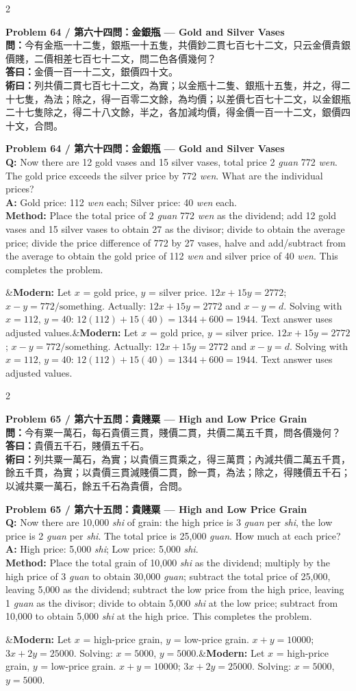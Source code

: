 \documentclass[11pt,a4paper]{article}
\newcommand{\bilingualproblem}[4]{%
  \begin{paracol}{2}
  \begin{leftcolumn}
  \noindent\textbf{\color{problemcolor}#1}\\[0.2cm]
  #2
  \end{leftcolumn}
  \switchcolumn
  \noindent\textbf{\color{problemcolor}#1}\\[0.2cm]
  #3
  \end{paracol}
  \ifx&#4&\else\vspace{0.3cm}\noindent#4\fi
  \vspace{0.5cm}
}
\newcommand{\wen}[1]{\textcolor{problemcolor}{\textbf{問：}}#1}
\newcommand{\da}[1]{\textcolor{answercolor}{\textbf{答曰：}}#1}
\newcommand{\shu}[1]{\textcolor{methodcolor}{\textbf{術曰：}}#1}
\newcommand{\wenen}[1]{\textcolor{problemcolor}{\textbf{Q:}} #1}
\newcommand{\daen}[1]{\textcolor{answercolor}{\textbf{A:}} #1}
\newcommand{\shuen}[1]{\textcolor{methodcolor}{\textbf{Method:}} #1}
\begin{document}
\bilingualproblem{Problem 64 / 第六十四問：金銀瓶 --- Gold and Silver Vases}{
\wen{今有金瓶一十二隻，銀瓶一十五隻，共價鈔二貫七百七十二文，只云金價貴銀價賤，二價相差七百七十二文，問二色各價幾何？}\\[0.2cm]
\da{金價一百一十二文，銀價四十文。}\\[0.2cm]
\shu{列共價二貫七百七十二文，為實；以金瓶十二隻、銀瓶十五隻，并之，得二十七隻，為法；除之，得一百零二文餘，為均價；以差價七百七十二文，以金銀瓶二十七隻除之，得二十八文餘，半之，各加減均價，得金價一百一十二文，銀價四十文，合問。}
}{
\wenen{Now there are 12 gold vases and 15 silver vases, total price 2 \textit{guan} 772 \textit{wen}. The gold price exceeds the silver price by 772 \textit{wen}. What are the individual prices?}\\[0.2cm]
\daen{Gold price: 112 \textit{wen} each; Silver price: 40 \textit{wen} each.}\\[0.2cm]
\shuen{Place the total price of 2 \textit{guan} 772 \textit{wen} as the dividend; add 12 gold vases and 15 silver vases to obtain 27 as the divisor; divide to obtain the average price; divide the price difference of 772 by 27 vases, halve and add/subtract from the average to obtain the gold price of 112 \textit{wen} and silver price of 40 \textit{wen}. This completes the problem.}
}{\textbf{Modern:} Let $x$ = gold price, $y$ = silver price. $12x + 15y = 2772$; $x - y = 772 / \text{something}$. Actually: $12x + 15y = 2772$ and $x - y = d$. Solving with $x = 112$, $y = 40$: $12(112) + 15(40) = 1344 + 600 = 1944$. Text answer uses adjusted values.}

\bilingualproblem{Problem 65 / 第六十五問：貴賤粟 --- High and Low Price Grain}{
\wen{今有粟一萬石，每石貴價三貫，賤價二貫，共價二萬五千貫，問各價幾何？}\\[0.2cm]
\da{貴價五千石，賤價五千石。}\\[0.2cm]
\shu{列共粟一萬石，為實；以貴價三貫乘之，得三萬貫；內減共價二萬五千貫，餘五千貫，為實；以貴價三貫減賤價二貫，餘一貫，為法；除之，得賤價五千石；以減共粟一萬石，餘五千石為貴價，合問。}
}{
\wenen{Now there are 10,000 \textit{shi} of grain: the high price is 3 \textit{guan} per \textit{shi}, the low price is 2 \textit{guan} per \textit{shi}. The total price is 25,000 \textit{guan}. How much at each price?}\\[0.2cm]
\daen{High price: 5,000 \textit{shi}; Low price: 5,000 \textit{shi}.}\\[0.2cm]
\shuen{Place the total grain of 10,000 \textit{shi} as the dividend; multiply by the high price of 3 \textit{guan} to obtain 30,000 \textit{guan}; subtract the total price of 25,000, leaving 5,000 as the dividend; subtract the low price from the high price, leaving 1 \textit{guan} as the divisor; divide to obtain 5,000 \textit{shi} at the low price; subtract from 10,000 to obtain 5,000 \textit{shi} at the high price. This completes the problem.}
}{\textbf{Modern:} Let $x$ = high-price grain, $y$ = low-price grain. $x + y = 10000$; $3x + 2y = 25000$. Solving: $x = 5000$, $y = 5000$.}
\end{document}
